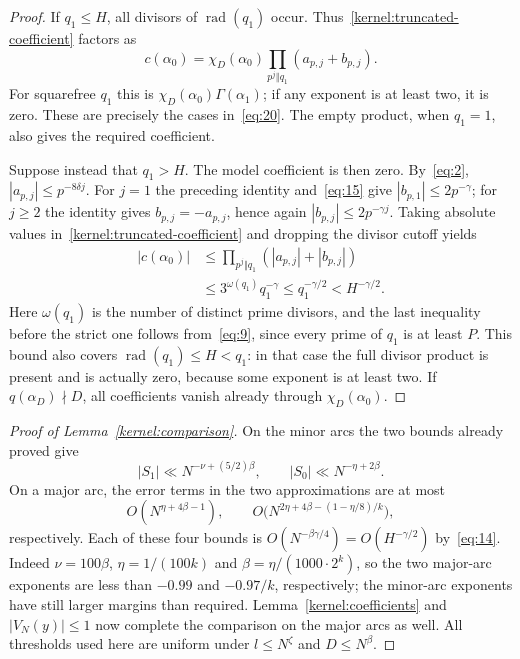 \begin{proof}
If $q_1\le H$, all divisors of $\operatorname{rad}(q_1)$ occur.
Thus~\eqref{kernel:truncated-coefficient} factors as
\[
 c(\alpha_0)=\chi_D(\alpha_0)
                    \prod_{p^j\Vert q_1}(a_{p,j}+b_{p,j}).
\]
For squarefree $q_1$ this is
$\chi_D(\alpha_0)\Gamma(\alpha_1)$; if any exponent is at least
two, it is zero. These are precisely the cases in~\eqref{eq:20}.
The empty product, when $q_1=1$, also gives the required coefficient.

Suppose instead that $q_1>H$. The model coefficient is then zero.
By~\eqref{eq:2}, $|a_{p,j}|\le p^{-8\delta j}$. For $j=1$ the
preceding identity and~\eqref{eq:15} give
$|b_{p,1}|\le2p^{-\gamma}$; for $j\ge2$ the identity gives
$b_{p,j}=-a_{p,j}$, hence again
$|b_{p,j}|\le2p^{-\gamma j}$. Taking absolute values
in~\eqref{kernel:truncated-coefficient} and dropping the divisor cutoff yields
\begin{align*}
 |c(\alpha_0)|
 &\le\prod_{p^j\Vert q_1}(|a_{p,j}|+|b_{p,j}|)\\
 &\le3^{\omega(q_1)}q_1^{-\gamma}
 \le q_1^{-\gamma/2}<H^{-\gamma/2}.
\end{align*}
Here $\omega(q_1)$ is the number of distinct prime divisors, and the
last inequality before the strict one follows from~\eqref{eq:9},
since every prime of $q_1$ is at least $P$. This bound also covers
$\operatorname{rad}(q_1)\le H<q_1$: in that case the full divisor
product is present and is actually zero, because some exponent is
at least two. If $q(\alpha_D)\nmid D$, all coefficients vanish
already through $\chi_D(\alpha_0)$.
\end{proof}

\begin{proof}[Proof of Lemma~\ref{kernel:comparison}]
On the minor arcs the two bounds already proved give
\[
 |S_1|\ll N^{-\nu+(5/2)\beta},\qquad
 |S_0|\ll N^{-\eta+2\beta}.
\]
On a major arc, the error terms in the two approximations are at most
\[
 O(N^{\eta+4\beta-1}),\qquad
 O\bigl(N^{2\eta+4\beta-(1-\eta/8)/k}\bigr),
\]
respectively. Each of these four bounds is
$O(N^{-\beta\gamma/4})=O(H^{-\gamma/2})$ by~\eqref{eq:14}.
Indeed $\nu=100\beta$, $\eta=1/(100k)$ and
$\beta=\eta/(1000\cdot2^k)$, so the two major-arc exponents are
less than $-0.99$ and $-0.97/k$, respectively; the minor-arc
exponents have still larger margins than required.
Lemma~\ref{kernel:coefficients} and $|V_N(y)|\le1$ now complete
the comparison on the major arcs as well. All thresholds used here
are uniform under $l\le N^\zeta$ and $D\le N^\beta$.
\end{proof}

